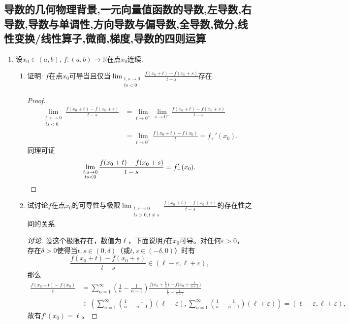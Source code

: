 \subsection{导数的几何物理背景,一元向量值函数的导数,左导数,右导数,导数与单调性,方向导数与偏导数,全导数,微分,线性变换/线性算子,微商,梯度,导数的四则运算}
\begin{1a}
\begin{enumerate}
\item 设\(x_0\in (a,b)\), \(f:(a,b)\rightarrow\mathbb{R}\)在点\(x_0\)连续.
\begin{enumerate}[label=(\arabic*)]
\item 证明: \(f\)在点\(x_0\)可导当且仅当\(\lim_{\substack{t,s\rightarrow 0\\ts<0}}\frac{f(x_0+t)-f(x_0+s)}{t-s}\)存在.
\begin{proof}
\[\begin{aligned}
\lim_{\substack{t,s\rightarrow 0\\ ts<0}}\frac{f(x_0+t)-f(x_0+s)}{t-s}&=\lim_{t\rightarrow 0^+}\lim_{s\rightarrow 0^-}\frac{f(x_0+t)-f(x_0+s)}{t-s}\\&=\lim_{t\rightarrow 0^+}\frac{f(x_0+t)-f(x_0)}{t}=f_+'(x_0).
\end{aligned}\]同理可证\[\lim_{\substack{t,s\rightarrow 0\\ ts<0}}\frac{f(x_0+t)-f(x_0+s)}{t-s}=f'_-(x_0).\qedhere\]
\end{proof}
\item 试讨论\(f\)在点\(x_0\)的可导性与极限\(\lim_{\substack{t,s\rightarrow 0\\ ts>0,t\ne s}}\frac{f(x_0+t)-f(x_0+s)}{t-s}\)的存在性之间的关系.
\begin{proof}[讨论]
设这个极限存在，数值为$\ell$，下面说明$f$在$x_0$可导。对任何$\varepsilon>0$，
存在$\delta>0$使得当$t,s\in(0,\delta)$（或$t,s\in(-\delta,0)$）时有
\[\frac{f(x_0+t)-f(x_0+s)}{t-s}\in(\ell-\varepsilon,\ell+\varepsilon),\]
那么\begin{align*}
    \frac{f(x_0+t)-f(x_0)}{t}&=\sum_{n=1}^{\infty}\left(\frac{1}{n}-\frac{1}{n+1}\right)
    \frac{f\big(x_0+\frac{t}{n}\big)-f\big(x_0+\frac{t}{n+1}\big)}{\frac{t}{n}-\frac{t}{n+1}}\\
    &\in\left(\sum_{n=1}^{\infty}\left(\frac{1}{n}-\frac{1}{n+1}\right)(\ell-\varepsilon),
    \sum_{n=1}^{\infty}\left(\frac{1}{n}-\frac{1}{n+1}\right)(\ell+\varepsilon)\right)
    =(\ell-\varepsilon,\ell+\varepsilon),
\end{align*}
故有$f'(x_0)=\ell$。


\end{proof}
\end{enumerate}
\end{enumerate}
\end{1a}
